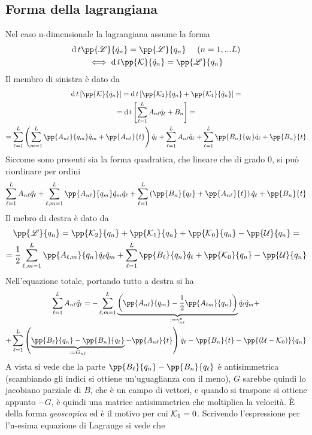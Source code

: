 \documentclass[Main.tex]{subfiles}
\begin{document}
\subsection{Forma della lagrangiana}
Nel caso n-dimensionale la lagrangiana assume la forma
\begin{gather}
	\dd{}{t} \pp{\L}{\dot q_n} = \pp{\L}{q_n} \ \ \ \ (n=1,...L)\\
	\iff \dd{}{t} \pp{\K}{\dot q_n} = \pp{\L}{q_n} 
\end{gather}
Il membro di sinistra è dato da
\begin{gather}
	\dd{}{t} \left[ \pp{\K}{\dot q_n} \right]= \dd{}{t} \left[\pp{\K_2}{\dot q_n} + \pp{\K_1}{\dot q_n}\right]=\\
	=\dd{}{t} \left[\sum_{\ell=1}^L A_{n \ell} \dot q_\ell + B_n\right]=\\
	= \sum_{\ell=1}^L \left( \sum_{m=1}^L \pp{A_{n \ell}}{ q_m} \dot q_m + \pp{A_{n\ell}}{t} \right) \dot q_\ell + \sum_{\ell=1}^L A_{n \ell} \ddot q_\ell + \sum_{\ell=1}^L \pp{B_n}{q_\ell}  \dot q_\ell + \pp{B_n}{t} \notag
\end{gather}
Siccome sono presenti sia la forma quadratica, che lineare che di grado 0, si può riordinare per ordini
\begin{gather}
	\sum_{\ell=1}^L A_{n \ell} \ddot q_\ell + \sum_{\ell,m=1}^L   \pp{A_{n \ell}}{ q_m} \dot q_m \dot q_\ell + \sum_{\ell=1}^L \left(\pp{B_n}{q_\ell}+\pp{A_{n\ell}}{t} \right) \dot q_\ell + \pp{B_n}{t}
\end{gather}
Il mebro di destra è dato da
\begin{gather}
	\pp{\L}{q_n} = \pp{\K_2}{q_n} + \pp{\K_1}{q_n} + \pp{\K_0}{q_n} - \pp{\U}{q_n}=\\
	=\frac{1}{2} \sum_{\ell, m=1}^L  \pp{A_{\ell,m}}{q_n} \dot q_\ell \dot q_m + \sum _{\ell=1}^L \pp{B_\ell}{q_n} \dot q_\ell + \pp{\K_0}{q_n} - \pp{\U}{q_n}
\end{gather}
Nell'equazione totale, portando tutto a destra si ha 
\begin{gather}
	\sum_{\ell=1}^L A_{n\ell} \ddot q _\ell = - \sum _{\ell,m=1}^L  \underbrace{\left( \pp{A_{n \ell}}{q_m} - \frac{1}{2} \pp{A_{\ell m }}{q_n} \right)}_{:=\gamma_{n \ell}^n} \dot q_\ell \dot q_m +\\+ \sum_{\ell=1}^L \left( \underbrace{\pp{B_\ell}{q_n} - \pp{B_n}{q_\ell}}_{:=G_{n\ell}} - \pp{A_{n\ell}}{t} \right) \dot q_\ell - \pp{B_n}{t} - \pp{(\U- \K_0)}{q_n} 
\end{gather}
A vista si vede che la parte $\pp{B_\ell}{q_n} - \pp{B_n}{q_\ell}$ è antisimmetrica (scambiando gli indici si ottiene un'uguaglianza con il meno), $G$ sarebbe quindi lo jacobiano parziale di $B$, che è un campo di vettori, e quando si traspone si ottiene appunto $-G$, è quindi una matrice antisimmetrica che moltiplica la velocità. È della forma \emph{geoscopica} ed è il motivo per cui $\mathcal{K}_1=0$. Scrivendo l'espressione per l'n-esima equazione di Lagrange si vede che
\end{document}
